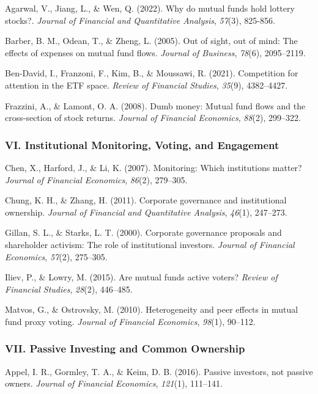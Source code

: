 \documentclass[
  12pt,
  letterpaper,
  DIV=11,
  numbers=noendperiod]{scrartcl}
\begin{document}
Agarwal, V., Jiang, L., \& Wen, Q. (2022). Why do mutual funds hold
lottery stocks?. \emph{Journal of Financial and Quantitative Analysis},
\emph{57}(3), 825-856.

Barber, B. M., Odean, T., \& Zheng, L. (2005). Out of sight, out of
mind: The effects of expenses on mutual fund flows. \emph{Journal of
Business}, \emph{78}(6), 2095--2119.

Ben-David, I., Franzoni, F., Kim, B., \& Moussawi, R. (2021).
Competition for attention in the ETF space. \emph{Review of Financial
Studies}, \emph{35}(9), 4382--4427.

Frazzini, A., \& Lamont, O. A. (2008). Dumb money: Mutual fund flows and
the cross-section of stock returns. \emph{Journal of Financial
Economics}, \emph{88}(2), 299--322.

\subsubsection{VI. Institutional Monitoring, Voting, and
Engagement}\label{vi.-institutional-monitoring-voting-and-engagement}

Chen, X., Harford, J., \& Li, K. (2007). Monitoring: Which institutions
matter? \emph{Journal of Financial Economics}, \emph{86}(2), 279--305.

Chung, K. H., \& Zhang, H. (2011). Corporate governance and
institutional ownership. \emph{Journal of Financial and Quantitative
Analysis}, \emph{46}(1), 247--273.

Gillan, S. L., \& Starks, L. T. (2000). Corporate governance proposals
and shareholder activism: The role of institutional investors.
\emph{Journal of Financial Economics}, \emph{57}(2), 275--305.

Iliev, P., \& Lowry, M. (2015). Are mutual funds active voters?
\emph{Review of Financial Studies}, \emph{28}(2), 446--485.

Matvos, G., \& Ostrovsky, M. (2010). Heterogeneity and peer effects in
mutual fund proxy voting. \emph{Journal of Financial Economics},
\emph{98}(1), 90--112.

\subsubsection{VII. Passive Investing and Common
Ownership}\label{vii.-passive-investing-and-common-ownership}

Appel, I. R., Gormley, T. A., \& Keim, D. B. (2016). Passive investors,
not passive owners. \emph{Journal of Financial Economics},
\emph{121}(1), 111--141.
\end{document}
